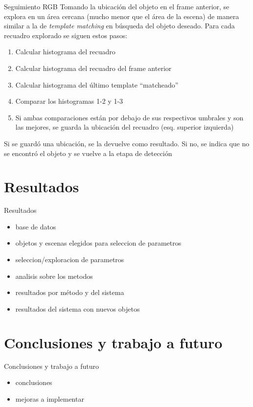 \documentclass[]{beamer}
\begin{document}
\begin{frame}[t]{Seguimiento RGB}
    Tomando la ubicación del objeto en el frame anterior, se explora en un área cercana (mucho menor que el área de la escena) de manera similar a la de \textit{template matching} en búsqueda del objeto deseado. Para cada recuadro explorado se siguen estos pasos:
    \begin{enumerate}
        \item Calcular histograma del recuadro
        \item Calcular histograma del recuadro del frame anterior
        \item Calcular histograma del último template ``matcheado''
        \item Comparar los histogramas 1-2 y 1-3
        \item Si ambas comparaciones están por debajo de sus respectivos umbrales y son las mejores, se guarda la ubicación del recuadro (esq. superior izquierda)
    \end{enumerate}
    Si se guardó una ubicación, se la devuelve como resultado. Si no, se indica que no se encontró el objeto y se vuelve a la etapa de detección
\end{frame}







\section{Resultados}
\begin{frame}{Resultados}
    \begin{itemize}
        \item base de datos
        \item objetos y escenas elegidos para seleccion de parametros
        \item seleccion/exploracion de parametros
        \item analisis sobre los metodos
        \item resultados por método y del sistema
        \item resultados del sistema con nuevos objetos
    \end{itemize}
\end{frame}


\section{Conclusiones y trabajo a futuro}
\begin{frame}{Conclusiones y trabajo a futuro}
    \begin{itemize}
        \item conclusiones
        \item mejoras a implementar
    \end{itemize}
\end{frame}
\end{document}
